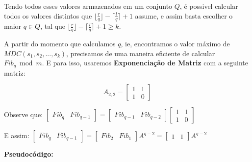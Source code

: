 Tendo todos esses valores armazenados em um conjunto $Q$, é possivel calcular todos os valores distintos que $\lfloor \frac{r}{q} \rfloor -\lceil \frac{l}{q} \rceil + 1$ assume, e assim basta escolher o maior $q \in Q$, tal que 
$\lfloor \frac{r}{q} \rfloor -\lceil \frac{l}{q} \rceil + 1 \geq k$.  

A partir do momento que calculamos $q$, ie, encontramos o valor máximo de $MDC(s_1,s_2,...,s_k)$, precisamos de uma maneira eficiente de calcular $Fib_q \bmod m$.
E para isso, usaremos \textbf{Exponenciação de Matriz} com a seguinte matriz:
\newline

\[ A_{2,2} =
\begin{bmatrix}
       1 & 1           \\[0.3em]
       1 & 0
\end{bmatrix}
\]
\newline

Observe que:
$
\begin{bmatrix}
       Fib_q & Fib_{q-1}
\end{bmatrix}
=
\begin{bmatrix}
       Fib_{q-1} & Fib_{q-2}
\end{bmatrix}
\begin{bmatrix}
       1 & 1           \\[0.3em]
       1 & 0
\end{bmatrix}
$
\newline

E assim:
$
\begin{bmatrix}
       Fib_q & Fib_{q-1}
\end{bmatrix}
=
\begin{bmatrix}
       Fib_{2} & Fib_{1}
\end{bmatrix}
A^{q-2}
=
\begin{bmatrix}
       1 & 1
\end{bmatrix}
A^{q-2}
$
\newline
\clearpage

\textbf{Pseudocódigo:}


